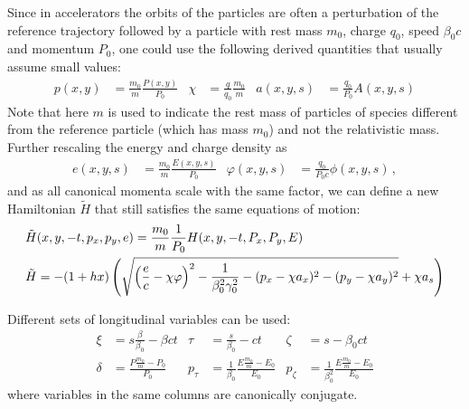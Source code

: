 Since in accelerators the orbits of the 
particles are often a perturbation of the reference trajectory followed by a
particle with rest mass $m_0$, charge $q_0$, speed $\beta_0 c$ and momentum
$P_0$, one could use the following derived quantities that usually assume small
values:
\begin{align}
p(x,y) &=
  \frac{m_0}{m}\frac{P(x,y)}{P_0}   &
\chi &=
  \frac{q}{q_0}\frac{m_0}{m} &
a(x,y,s) &=
  \frac{q_0}{P_0}  A(x,y,s)
\end{align}
Note that here $m$ is used to indicate the rest mass of particles of species
different from the reference particle (which has mass $m_0$) and not the relativistic mass.
Further rescaling the energy and charge density as
\begin{align}
  e(x,y,s) &=
  \frac{m_0}{m}\frac{E(x,y,s)}{P_0}   &
  \varphi(x,y,s) &=
  \frac{q_0}{P_0c}\phi(x,y,s) \,,
\end{align}
and as all canonical momenta scale with the same factor, we can define a new Hamiltonian
$\tilde{H}$ that still satisfies the same equations of motion:
\begin{align}\notag
  &\tilde{H}(x,y,-t, p_x, p_y, e) =
      \frac{m_0}{m}\frac{1}{P_0}H(x,y,-t, P_x, P_y, E) \\
  &\tilde{H}=
    - (1+h x) \left(
      \sqrt{ 
          \left(\frac{e}{c} - \chi\varphi\right)^2
            - \frac{1}{\beta_0^2\gamma_0^2}
           - (p_x - \chi a_x)^2
           - (p_y - \chi a_y)^2}
       + \chi a_s
    \right)
\end{align}

Different sets of longitudinal variables can be used:
\begin{align}
\xi &= s \frac{\beta}{\beta_0} - \beta c t &
\tau &= \frac{s}{\beta_0} - ct &
\zeta &= s - \beta_0 ct \\
\delta &=
  \frac{P \frac{m_0}{m} -P_0}{P_0} &
p_\tau &=
  \frac{1}{\beta_0} \frac{E \frac{m_0}{m} -E_0}{E_0} &
p_\zeta &=
  \frac{1}{\beta_0^2}\frac{E \frac{m_0}{m} -E_0}{E_0}
\end{align}
where variables in the same columns are canonically conjugate.

